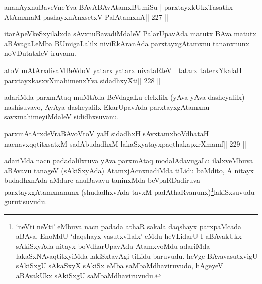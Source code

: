\begin{shl}
ananAyxnuBaveVneYva BAvABAvAtamxBUmiSu |
parxtayxkUkxTasathx AtAmxnaM pashayxnAnxsetxV PalAtamxnA\hfill || 227 ||
\end{shl}

\begin{artha}
itarApeVkeSxyilalxda sAvxnuBavadiMdaleV PalarUpavAda matutx BAva matutx aBAvagaLeMba BUmigaLalilx niviRkAranAda parxtayxgAtamxnu tananxnunx noVDutatxleV iruvanu.
\end{artha}


\begin{shl}
atoV mAtArxdisaMBeVdoV yatarx yatarx nivataRteV |
tatarx \footnotemark[1]taterxYkalaH parxtayxkasxvXmahimenxYva sidadhxyXti\hfill || 228 ||
\end{shl}

\begin{artha}
adariMda parxmAtaq muMtAda BeVdagaLu elelxlilx (yAva yAva dasheyalilx) nashisuvavo, AyAya dasheyalilx EkarUpavAda parxtayxgAtamxnu savxmahimeyiMdaleV sididhxsuvanu.
\end{artha}


\begin{shl}
parxmAtArxdeVraBAvoV\s toV yaH sidadhxH sAvxtamxboVdhataH |
nacnavxqqtitxsatxM sadAbudadhxM lakaSxyatayxpaqthakapxrXmamf\hfill || 229 ||
\end{shl}

\begin{artha}
adariMda nacn padadalilxruva yAva parxmAtaq modalAdavugaLu
ilalxveMbuva aBAvavu tanageV (sAkiSxyAda) AtamxjAcnxnadiMda tiLidu
baMdito, A nitayx budadhxnAda aMdare anuBavavu taninxMda
beVpaRDadiruva parxtayxgAtamxnanunx (shudadhxvAda
tavxM padAthaRvanunx)\footnote[1]{`neVti neVti' eMbuva nacn padada
  athaR sakala daqshayx parxpaMcada aBAva, EnoMdU `daqshayx
  vasutxvilalx' eMdu heVLidarU I aBAvakUkx sAkiSxyAda nitayx
  boVdharUpavAda AtamxvoMdu adariMda lakaSxNAvaqtitxyiMda lakiSxtavAgi
tiLidu baruvudu. heVge BAvavasutxvigU sAkiSxgU sAkaSxyX sAkiSx eMba
saMbaMdhaviruvudo, hAgeyeV aBAvakUkx sAkiSxgU saMbaMdhaviruvudu.}lakiSxsuvudu
gurutisuvudu.
\end{artha}


